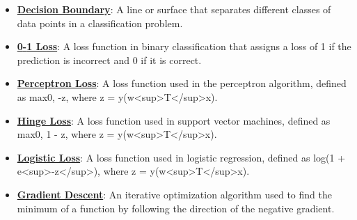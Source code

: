 \documentclass{article}%
\begin{document}
\begin{itemize}[leftmargin=*]
\item \href{https://purdue.brightspace.com/d2l/common/assets/pdfjs-d2l-dist/1.0.14-legacy/web/viewer.html?file=%2Fcontent%2Fenforced%2F1095467-wl.202510.CS.24300.001%2F05L2-ML Basics.pdf%3Fou%3D1095467&lang=en-us&container=d2l-fileviewer-rendered-pdf&fullscreen=d2l-fileviewer-rendered-pdf-dialog&height=667#page=24}{\textbf{Decision Boundary}}: A line or surface that separates different classes of data points in a classification problem.%
\item \href{https://purdue.brightspace.com/d2l/common/assets/pdfjs-d2l-dist/1.0.14-legacy/web/viewer.html?file=%2Fcontent%2Fenforced%2F1095467-wl.202510.CS.24300.001%2F05L2-ML Basics.pdf%3Fou%3D1095467&lang=en-us&container=d2l-fileviewer-rendered-pdf&fullscreen=d2l-fileviewer-rendered-pdf-dialog&height=667#page=25}{\textbf{0{-}1 Loss}}: A loss function in binary classification that assigns a loss of 1 if the prediction is incorrect and 0 if it is correct.%
\item \href{https://purdue.brightspace.com/d2l/common/assets/pdfjs-d2l-dist/1.0.14-legacy/web/viewer.html?file=%2Fcontent%2Fenforced%2F1095467-wl.202510.CS.24300.001%2F05L2-ML Basics.pdf%3Fou%3D1095467&lang=en-us&container=d2l-fileviewer-rendered-pdf&fullscreen=d2l-fileviewer-rendered-pdf-dialog&height=667#page=27}{\textbf{Perceptron Loss}}: A loss function used in the perceptron algorithm, defined as max{0, -z}, where z = y(w<sup>T</sup>x).%
\item \href{https://purdue.brightspace.com/d2l/common/assets/pdfjs-d2l-dist/1.0.14-legacy/web/viewer.html?file=%2Fcontent%2Fenforced%2F1095467-wl.202510.CS.24300.001%2F05L2-ML Basics.pdf%3Fou%3D1095467&lang=en-us&container=d2l-fileviewer-rendered-pdf&fullscreen=d2l-fileviewer-rendered-pdf-dialog&height=667#page=27}{\textbf{Hinge Loss}}: A loss function used in support vector machines, defined as max{0, 1 - z}, where z = y(w<sup>T</sup>x).%
\item \href{https://purdue.brightspace.com/d2l/common/assets/pdfjs-d2l-dist/1.0.14-legacy/web/viewer.html?file=%2Fcontent%2Fenforced%2F1095467-wl.202510.CS.24300.001%2F05L2-ML Basics.pdf%3Fou%3D1095467&lang=en-us&container=d2l-fileviewer-rendered-pdf&fullscreen=d2l-fileviewer-rendered-pdf-dialog&height=667#page=27}{\textbf{Logistic Loss}}: A loss function used in logistic regression, defined as log(1 + e<sup>-z</sup>), where z = y(w<sup>T</sup>x).%
\item \href{https://purdue.brightspace.com/d2l/common/assets/pdfjs-d2l-dist/1.0.14-legacy/web/viewer.html?file=%2Fcontent%2Fenforced%2F1095467-wl.202510.CS.24300.001%2F05L2-ML Basics.pdf%3Fou%3D1095467&lang=en-us&container=d2l-fileviewer-rendered-pdf&fullscreen=d2l-fileviewer-rendered-pdf-dialog&height=667#page=28}{\textbf{Gradient Descent}}: An iterative optimization algorithm used to find the minimum of a function by following the direction of the negative gradient.%

\end{itemize}
\end{document}
